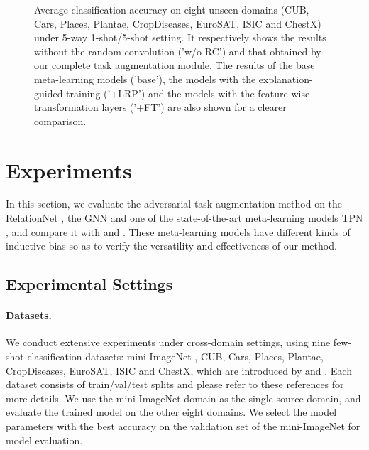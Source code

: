 \documentclass{article}
\begin{document}
\begin{figure}
    \centering
    \caption{Average classification accuracy on eight unseen domains (CUB, Cars, Places, Plantae, CropDiseases, EuroSAT, ISIC and ChestX) under 5-way 1-shot/5-shot setting. It respectively shows the results without the random convolution ('w/o RC') and that obtained by our complete task augmentation module. The results of the base meta-learning models ('base'), the models with the explanation-guided training ('+LRP') and the models with the feature-wise transformation layers ('+FT') are also shown for a clearer comparison.}
    \label{fig2}
\end{figure}

\section{Experiments}
In this section, we evaluate the adversarial task augmentation method on the RelationNet \cite{sung2018learning}, the GNN \cite{garcia2018few} and one of the state-of-the-art meta-learning models TPN \cite{liu2019learning}, and compare it with \cite{DBLP:conf/iclr/TsengLH020} and \cite{sun2020explanation}. These meta-learning models have different kinds of inductive bias so as to verify the versatility and effectiveness of our method.

\subsection{Experimental Settings}
\paragraph{Datasets.} We conduct extensive experiments under cross-domain settings, using nine few-shot classification datasets: mini-ImageNet \cite{DBLP:conf/iclr/RaviL17}, CUB, Cars, Places, Plantae, CropDiseases, EuroSAT, ISIC and ChestX, which are introduced by \cite{DBLP:conf/iclr/TsengLH020} and \cite{guo2020broader}. Each dataset consists of train/val/test splits and please refer to these references for more details. We use the mini-ImageNet domain as the single source domain, and evaluate the trained model on the other eight domains. We select the model parameters with the best accuracy on the validation set of the mini-ImageNet for model evaluation.
\end{document}
